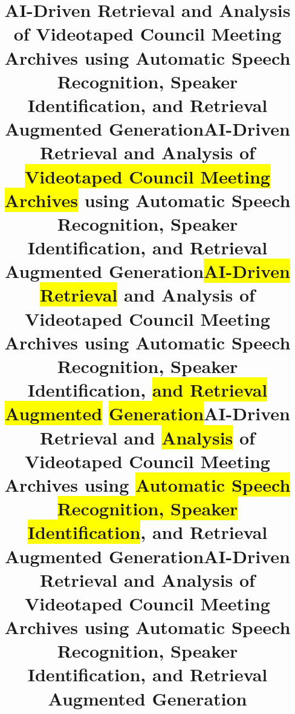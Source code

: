 \documentclass[aspectratio=169,sidebar]{uva-inf-presentation}
\title{AI-Driven Retrieval and Analysis of Videotaped Council Meeting Archives using Automatic Speech Recognition, Speaker Identification, and Retrieval Augmented Generation}
\begin{document}
\begin{titelframe}
\titlepage
\end{titelframe}

\title{AI-Driven Retrieval and Analysis of \colorbox{yellow}{Videotaped Council Meeting Archives} using Automatic Speech Recognition, Speaker Identification, and Retrieval Augmented Generation} 
\begin{titelframe}
\titlepage
\end{titelframe}

\title{\colorbox{yellow}{AI-Driven Retrieval} and Analysis of Videotaped Council Meeting Archives using Automatic Speech Recognition, Speaker Identification, \colorbox{yellow}{and Retrieval Augmented} \colorbox{yellow}{Generation}}
\begin{titelframe}
\titlepage
\end{titelframe}

\title{AI-Driven Retrieval and \colorbox{yellow}{Analysis} of Videotaped Council Meeting Archives using \colorbox{yellow}{Automatic Speech Recognition, Speaker} \colorbox{yellow}{Identification}, and Retrieval Augmented  Generation}
\begin{titelframe}
\titlepage
\end{titelframe}


\title{AI-Driven Retrieval and Analysis of Videotaped Council Meeting Archives using Automatic Speech Recognition, Speaker Identification, and Retrieval Augmented Generation} 


\end{document}
